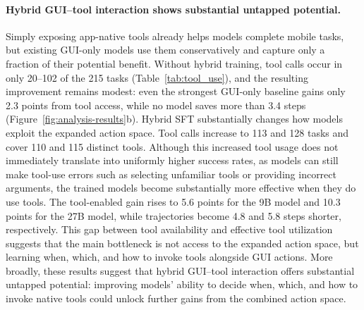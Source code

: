 \paragraph{Hybrid GUI--tool interaction shows substantial untapped potential.}

Simply exposing app-native tools already helps models complete mobile tasks, but existing GUI-only models use them conservatively and capture only a fraction of their potential benefit. Without hybrid training, tool calls occur in only 20--102 of the 215 tasks (Table~\ref{tab:tool_use}), and the resulting improvement remains modest: even the strongest GUI-only baseline gains only 2.3 points from tool access, while no model saves more than 3.4 steps (Figure~\ref{fig:analysis-results}b). Hybrid SFT substantially changes how models exploit the expanded action space. Tool calls increase to 113 and 128 tasks and cover 110 and 115 distinct tools. Although this increased tool usage does not immediately translate into uniformly higher success rates, as models can still make tool-use errors such as selecting unfamiliar tools or providing incorrect arguments, the trained models become substantially more effective when they do use tools. The tool-enabled gain rises to 5.6 points for the 9B model and 10.3 points for the 27B model, while trajectories become 4.8 and 5.8 steps shorter, respectively. This gap between tool availability and effective tool utilization suggests that the main bottleneck is not access to the expanded action space, but learning when, which, and how to invoke tools alongside GUI actions. More broadly, these results suggest that hybrid GUI--tool interaction offers substantial untapped potential: improving models' ability to decide when, which, and how to invoke native tools could unlock further gains from the combined action space.
